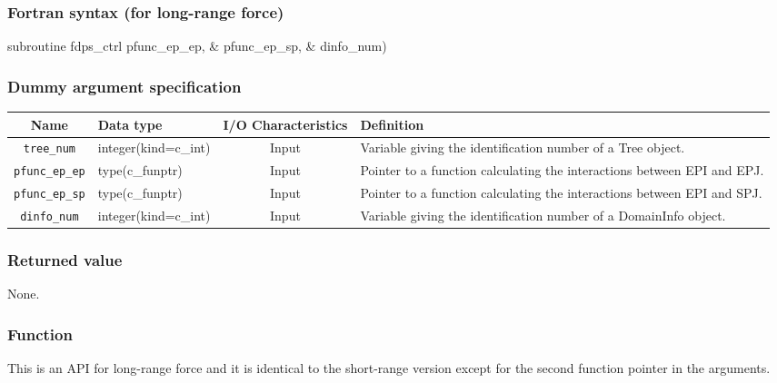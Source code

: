 \subsubsection*{Fortran syntax (for long-range force)}
\begin{screen}
\begin{spverbatim}
subroutine fdps_ctrl%
                                            pfunc_ep_ep, &
                                            pfunc_ep_sp, &
                                            dinfo_num)
\end{spverbatim}
\end{screen}

\subsubsection*{Dummy argument specification}
\begin{table}[h]
\begin{tabularx}{\linewidth}{clcX}
\toprule
\rowcolor{Snow2}
Name & Data type & I/O Characteristics & Definition \\
\midrule
\verb|tree_num|    & integer(kind=c\_int)   & Input     & Variable giving the identification number of a Tree object. \\
\verb|pfunc_ep_ep| & type(c\_funptr)        & Input     & Pointer to a function calculating the interactions between EPI and EPJ. \\
\verb|pfunc_ep_sp| & type(c\_funptr)        & Input     & Pointer to a function calculating the interactions between EPI and SPJ. \\
\verb|dinfo_num|   & integer(kind=c\_int)   & Input     & Variable giving the identification number of a DomainInfo object. \\
\bottomrule
\end{tabularx}
\end{table}


\subsubsection*{Returned value}
None.

\subsubsection*{Function}
This is an API for long-range force and it is identical to the short-range version except for the second function pointer in the arguments.

